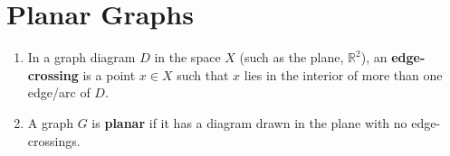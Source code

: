 \section{Planar Graphs} \label{sec:planar}
\begin{definition}\leavevmode
\begin{enumerate}
    \item In a graph diagram $D$ in the space $X$ (such as the plane, $\mathbb{R}^2$), an \textbf{edge-crossing} is a point $x\in X$ such that $x$ lies in the interior of more than one edge/arc of $D$.
    \item A graph $G$ is \textbf{planar} if it has a diagram drawn in the plane with no edge-crossings.
\end{enumerate}
\end{definition}


